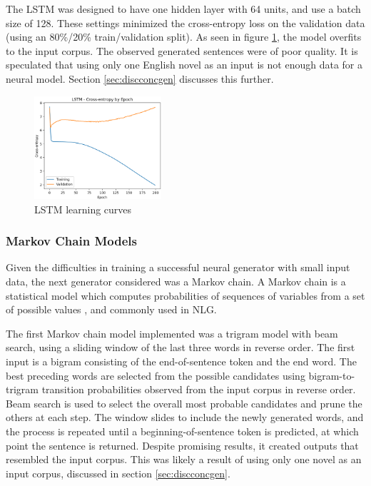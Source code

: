 \documentclass[11pt,a4paper]{article}
\begin{document}
The LSTM was designed to have one hidden layer with 64 units, and use a batch size of 128. These settings minimized the cross-entropy loss on the validation data (using an 80\%/20\% train/validation split). As seen in figure \ref{fig:LearningCurves}, the model overfits to the input corpus. The observed generated sentences were of poor quality. It is speculated that using only one English novel as an input is not enough data for a neural model. Section \ref{sec:discconcgen} discusses this further.

\begin{figure}[h]
    \centering
    \includegraphics[width=0.42\textwidth]{LSTM_Loss.png}
    \caption{LSTM learning curves}
    \label{fig:LearningCurves}
\end{figure}

\subsubsection{Markov Chain Models}
\label{sec:markov}

Given the difficulties in training a successful neural generator with small input data, the next generator considered was a Markov chain. A Markov chain is a statistical model which computes probabilities of sequences of variables from a set of possible values \cite[Chapter~8]{jurafskymarkov}, and commonly used in NLG.

The first Markov chain model implemented was a trigram model with beam search, using a sliding window of the last three words in reverse order. The first input is a bigram consisting of the end-of-sentence token and the end word. The best preceding words are selected from the possible candidates using bigram-to-trigram transition probabilities observed from the input corpus in reverse order. Beam search is used to select the overall most probable candidates and prune the others at each step. The window slides to include the newly generated words, and the process is repeated until a beginning-of-sentence token is predicted, at which point the sentence is returned. Despite promising results, it created outputs that resembled the input corpus. This was likely a result of using only one novel as an input corpus, discussed in section \ref{sec:discconcgen}.
\end{document}
